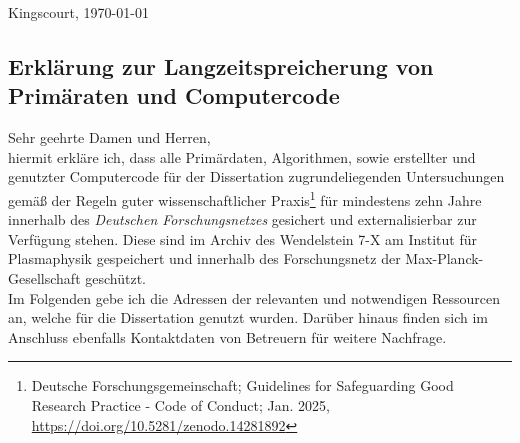 \documentclass[
  fontsize=11pt,
  paper=a4,
]{report}
\begin{document}
    \pagestyle{empty}%

    \begin{flushright}
      Kingscourt, \today\\[1cm]%
    \end{flushright}

    \subsection*{%
        Erklärung zur Langzeitspreicherung von Primäraten und Computercode%
    }%
        \vspace*{0.5cm}%
        Sehr geehrte Damen und Herren,\\[0.5cm]%
%
    hiermit erkläre ich, dass alle Primärdaten, Algorithmen, sowie erstellter und genutzter Computercode für der Dissertation zugrundeliegenden Untersuchungen gemäß der Regeln guter wissenschaftlicher Praxis\footnote[1]{%
      Deutsche Forschungsgemeinschaft; Guidelines for Safeguarding Good Research Practice - Code of Conduct; Jan. 2025, \url{https://doi.org/10.5281/zenodo.14281892}%
    } für mindestens zehn Jahre innerhalb des \textit{Deutschen Forschungsnetzes} gesichert und externalisierbar zur Verfügung stehen. Diese sind im Archiv des Wendelstein 7-X am Institut für Plasmaphysik gespeichert und innerhalb des Forschungsnetz der Max-Planck-Gesellschaft geschützt.\\[0.5cm]%
%
    Im Folgenden gebe ich die Adressen der relevanten und notwendigen Ressourcen an, welche für die Dissertation genutzt wurden. Darüber hinaus finden sich im Anschluss ebenfalls Kontaktdaten von Betreuern für weitere Nachfrage.\\%
%
\end{document}
